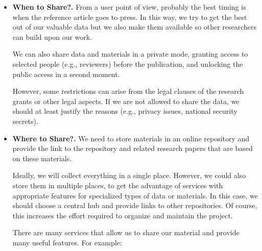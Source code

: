 \documentclass[
  11pt,
]{book}
\begin{document}
\begin{itemize}
\item
  \textbf{When to Share?.} From a user point of view, probably the best timing is when the reference article goes to press. In this way, we try to get the best out of our valuable data but we also make them available so other researchers can build upon our work.

  We can also share data and materials in a private mode, granting access to selected people (e.g., reviewers) before the publication, and unlocking the public access in a second moment.

  However, some restrictions can arise from the legal clauses of the research grants or other legal aspects. If we are not allowed to share the data, we should at least justify the reasons (e.g., privacy issues, national security secrets).
\item
  \textbf{Where to Share?.} We need to store materials in an online repository and provide the link to the repository and related research papers that are based on these materials.

  Ideally, we will collect everything in a single place. However, we could also store them in multiple places, to get the advantage of services with appropriate features for specialized types of data or materials. In this case, we should choose a central hub and provide links to other repositories. Of course, this increases the effort required to organize and maintain the project.

  There are many services that allow us to share our material and provide many useful features. For example:


\end{itemize}
\end{document}
